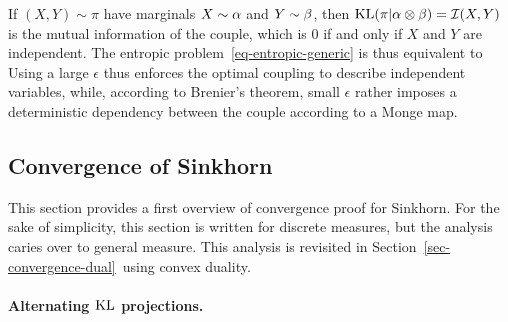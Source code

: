 %
%
%

\begin{rem}
	If $(X,Y) \sim \pi$ have marginals $X \sim \alpha$ and $Y \sim \beta$, then $\operatorname{KL}(\pi|\alpha \otimes \beta) = \mathcal{I}(X,Y)$ is the mutual information of the couple, which is 0 if and only if $X$ and $Y$ are independent. The entropic problem~\eqref{eq-entropic-generic} is thus equivalent to
	Using a large $\epsilon$ thus enforces the optimal coupling to describe independent variables, while, according to Brenier's theorem, small $\epsilon$ rather imposes a deterministic dependency between the couple according to a Monge map. 
\end{rem}




\subsection{Convergence of Sinkhorn}
\label{sec-convergence-init}

This section provides a first overview of convergence proof for Sinkhorn. For the sake of simplicity, this section is written for discrete measures, but the analysis caries over to general measure. This analysis is revisited in Section~\ref{sec-convergence-dual} using convex duality. 

\paragraph{Alternating $\operatorname{KL}$ projections.}

